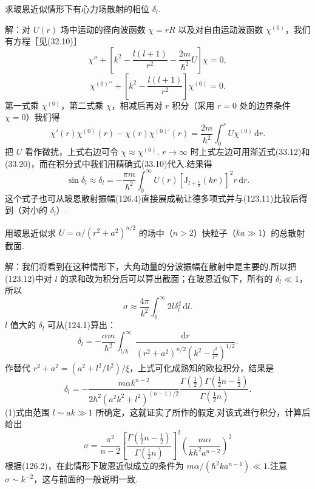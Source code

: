 \begin{xiti}
\quad 求玻恩近似情形下有心力场散射的相位 $\delta_l$.

解：对 $U(r)$ 场中运动的径向波函数 $\chi=rR$ 以及对自由运动波函数 $\chi^{(0)}$，我们有方程［见(32.10)］
\begin{equation*}
  \chi''+\left[k^2-\frac{l(l+1)}{r^2}
  -\frac{2m}{\hbar^2}U\right]\chi=0,
\end{equation*}
\begin{equation*}
  \chi^{(0)\prime\prime}
  +\left[k^2-\frac{l(l+1)}{r^2}\right]\chi^{(0)}=0.
\end{equation*}
第一式乘 $\chi^{(0)}$，第二式乘 $\chi$，相减后再对 $r$ 积分（采用 $r=0$ 处的边界条件 $\chi=0$）我们得
\begin{equation*}
  \chi'(r)\chi^{(0)}(r)-\chi(r)\chi^{(0)\prime}(r)
  =\frac{2m}{\hbar^2}\int_0^{r}U\chi^{(0)}\,\mathrm{d}r.
\end{equation*}
把 $U$ 看作微扰，上式右边可令 $\chi\approx\chi^{(0)}$. $r\to\infty$ 时上式左边可用渐近式(33.12)和(33.20)，而在积分式中我们用精确式(33.10)代入.结果得
\begin{equation*}
  \sin\delta_l\approx\delta_l
  =-\frac{\pi m}{\hbar^2}\int_0^{\infty}U(r)
  \left[\mathrm{J}_{l+\frac{1}{2}}(kr)\right]^2r\,\mathrm{d}r.
\end{equation*}
这个式子也可从玻恩散射振幅(126.4)直接展成勒让德多项式并与(123.11)比较后得到（对小的 $\delta_l$\mbox{）.}

\quad 用玻恩近似求 $U=\alpha/(r^2+a^2)^{n/2}$ 的场中（$n>2$）快粒子（$ka\gg1$）的总散射截面.

解：我们将看到在这种情形下，大角动量的分波振幅在散射中是主要的.所以把(123.12)中对 $l$ 的求和改为积分后可以算出截面；在玻恩近似下，所有的 $\delta_l\ll1$，所以
\setcounter{equation}{0}\renewcommand{\theequation}{\arabic{equation}}%
\begin{equation}
  \sigma\approx\frac{4\pi}{k^2}\int_0^{\infty}2l\delta_l^2\,\mathrm{d}l.
\end{equation}
$l$ 值大的 $\delta_l$ 可从(124.1)算出：
\begin{equation*}
  \delta_l=-\frac{\alpha m}{\hbar^2}\int_{l/k}^{\infty}
  \frac{\mathrm{d}r}{(r^2+a^2)^{n/2}
  \left(k^2-\frac{l^2}{r^2}\right)^{1/2}}.
\end{equation*}
作替代 $r^2+a^2=(a^2+l^2/k^2)/\xi$，上式可化成熟知的欧拉积分，结果是
\begin{equation}
  \delta_l=-\frac{m\alpha k^{n-2}}{2\hbar^2(a^2k^2+l^2)^{(n-1)/2}}
  \frac{\Gamma\left(\frac{1}{2}\right)\Gamma\left(\frac{1}{2}n-\frac{1}{2}\right)}
  {\Gamma\left(\frac{1}{2}n\right)}.
\end{equation}
(1)式由范围 $l\sim ak\gg1$ 所确定，这就证实了所作的假定.对该式进行积分，计算后给出
\begin{equation}
  \sigma=\frac{\pi^2}{n-2}
  \left[\frac{\Gamma\left(\frac{1}{2}n-\frac{1}{2}\right)}
  {\Gamma\left(\frac{1}{2}n\right)}\right]^2
  \left(\frac{m\alpha}{k\hbar^2a^{n-2}}\right)^2
\end{equation}
根据(126.2)，在此情形下玻恩近似成立的条件为
$m\alpha/(\hbar^2ka^{n-1})\ll1$.注意 $\sigma\sim k^{-2}$，这与前面的一般说明一致.


\end{xiti}
